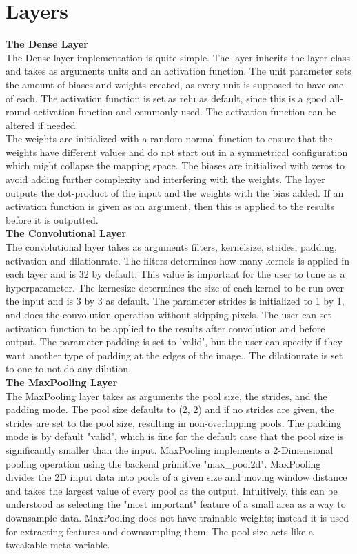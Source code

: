 \section{Layers}

\textbf{The Dense Layer}
\\
The Dense layer implementation is quite simple. The layer inherits the layer class and takes as arguments units and an activation function. The unit parameter sets the amount of biases and weights created, as every unit is supposed to have one of each.  The activation function is set as relu as default, since this is a good all-round activation function and commonly used.  The activation function can be altered if needed.  \\
The weights are initialized with a random normal function to ensure that the weights have different values and do not start out in a symmetrical configuration which might collapse the mapping space.  The biases are initialized with zeros to avoid adding further complexity and interfering with the weights. The layer outputs the dot-product of the input and the weights with the bias added. If an activation function is given as an argument, then this is applied to the results before it is outputted.
\\
\textbf{The Convolutional Layer}
\\
The convolutional layer takes as arguments filters, kernelsize, strides, padding, activation and dilationrate. The filters determines how many kernels is applied in each layer and is 32 by default. This value is important for the user to tune as a hyperparameter. The kernesize determines the size of each kernel to be run over the input and is 3 by 3 as default. The parameter strides is initialized to 1 by 1, and does the convolution operation without skipping pixels. The user can set activation function to be applied to the results after convolution and before output. The parameter padding is set to 'valid',  but the user can specify if they want another type of padding at the edges of the image.. The dilationrate is set to one to not do any dilution. 
\\
\textbf{The MaxPooling Layer}
\\
The MaxPooling layer takes as arguments the pool size, the strides, and the padding mode. The pool size defaults to (2, 2) and if no strides are given, the strides are set to the pool size, resulting in non-overlapping pools. The padding mode is by default "valid", which is fine for the default case that the pool size is significantly smaller than the input. MaxPooling implements a 2-Dimensional pooling operation using the backend primitive "max_pool2d". MaxPooling divides the 2D input data into pools of a given size and moving window distance and takes the largest value of every pool as the output. Intuitively, this can be understood as selecting the "most important" feature of a small area as a way to downsample data. MaxPooling does not have trainable weights; instead it is used for extracting features and downsampling them. The pool size acts like a tweakable meta-variable.
